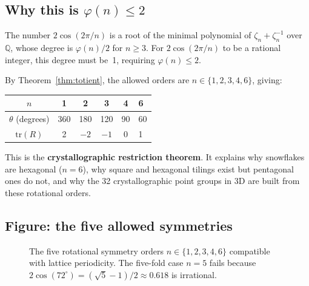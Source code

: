 \documentclass[preprint]{revtex4-2}
\begin{document}
\subsection{Why this is $\varphi(n) \leq 2$}

The number $2\cos(2\pi/n)$ is a root of the minimal polynomial of $\zeta_n + \zeta_n^{-1}$ over $\mathbb{Q}$, whose degree is $\varphi(n)/2$ for $n \geq 3$. For $2\cos(2\pi/n)$ to be a rational integer, this degree must be~1, requiring $\varphi(n) \leq 2$.

By Theorem~\ref{thm:totient}, the allowed orders are $n \in \{1, 2, 3, 4, 6\}$, giving:

\begin{center}
\begin{tabular}{ccccc}
\toprule
$n$ & 1 & 2 & 3 & 4 & 6 \\
\midrule
$\theta$ (degrees) & 360 & 180 & 120 & 90 & 60 \\
$\mathrm{tr}(R)$ & 2 & $-2$ & $-1$ & 0 & 1 \\
\bottomrule
\end{tabular}
\end{center}

This is the \textbf{crystallographic restriction theorem}. It explains why snowflakes are hexagonal ($n=6$), why square and hexagonal tilings exist but pentagonal ones do not, and why the 32 crystallographic point groups in 3D are built from these rotational orders.

\subsection{Figure: the five allowed symmetries}

\begin{figure}[h]
\centering
\caption{The five rotational symmetry orders $n \in \{1,2,3,4,6\}$ compatible with lattice periodicity. The five-fold case $n=5$ fails because $2\cos(72^\circ) = (\sqrt{5}-1)/2 \approx 0.618$ is irrational.}
\label{fig:symmetries}
\end{figure}
\end{document}
